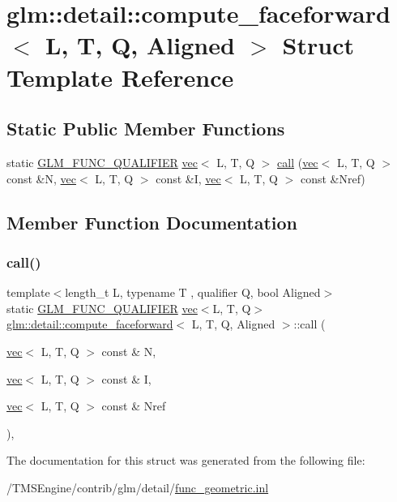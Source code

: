 \hypertarget{structglm_1_1detail_1_1compute__faceforward}{}\section{glm\+:\+:detail\+:\+:compute\+\_\+faceforward$<$ L, T, Q, Aligned $>$ Struct Template Reference}
\label{structglm_1_1detail_1_1compute__faceforward}
\subsection*{Static Public Member Functions}
\begin{DoxyCompactItemize}
\item 
static \hyperlink{setup_8hpp_a33fdea6f91c5f834105f7415e2a64407}{G\+L\+M\+\_\+\+F\+U\+N\+C\+\_\+\+Q\+U\+A\+L\+I\+F\+I\+ER} \hyperlink{structglm_1_1vec}{vec}$<$ L, T, Q $>$ \hyperlink{structglm_1_1detail_1_1compute__faceforward_a8f885365775eabaea213e3e58d7fe0fd}{call} (\hyperlink{structglm_1_1vec}{vec}$<$ L, T, Q $>$ const \&N, \hyperlink{structglm_1_1vec}{vec}$<$ L, T, Q $>$ const \&I, \hyperlink{structglm_1_1vec}{vec}$<$ L, T, Q $>$ const \&Nref)
\end{DoxyCompactItemize}


\subsection{Member Function Documentation}
\mbox{\label{structglm_1_1detail_1_1compute__faceforward_a8f885365775eabaea213e3e58d7fe0fd}} 
\subsubsection{\texorpdfstring{call()}{call()}}
{\footnotesize\ttfamily template$<$length\+\_\+t L, typename T , qualifier Q, bool Aligned$>$ \\
static \hyperlink{setup_8hpp_a33fdea6f91c5f834105f7415e2a64407}{G\+L\+M\+\_\+\+F\+U\+N\+C\+\_\+\+Q\+U\+A\+L\+I\+F\+I\+ER} \hyperlink{structglm_1_1vec}{vec}$<$L, T, Q$>$ \hyperlink{structglm_1_1detail_1_1compute__faceforward}{glm\+::detail\+::compute\+\_\+faceforward}$<$ L, T, Q, Aligned $>$\+::call (\begin{DoxyParamCaption}\item[{\hyperlink{structglm_1_1vec}{vec}$<$ L, T, Q $>$ const \&}]{N,  }\item[{\hyperlink{structglm_1_1vec}{vec}$<$ L, T, Q $>$ const \&}]{I,  }\item[{\hyperlink{structglm_1_1vec}{vec}$<$ L, T, Q $>$ const \&}]{Nref }\end{DoxyParamCaption})\hspace{0.3cm}{\ttfamily [inline]}, {\ttfamily [static]}}



The documentation for this struct was generated from the following file\+:\begin{DoxyCompactItemize}
\item 
/\+T\+M\+S\+Engine/contrib/glm/detail/\hyperlink{func__geometric_8inl}{func\+\_\+geometric.\+inl}\end{DoxyCompactItemize}
